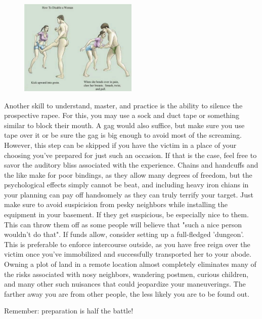 \begin{figure}
\includegraphics[width=0.5\textwidth]{images/cunt_punt.jpg}
\end{figure}

Another skill to understand, master, and practice is the ability to silence the prospective rapee.
For this, you may use a sock and duct tape or something similar to block their mouth. 
A gag would also suffice, but make sure you use tape over it or be sure the gag is big enough 
to avoid most of the screaming. However, this step can be skipped if you have the victim in a place of
your choosing you've prepared for just such an occasion. If that is the case, feel free to savor the
auditory bliss associated with the experience. Chains and handcuffs and the like make for poor bindings,
as they allow many degrees of freedom, but the psychological effects simply cannot be beat, and including 
heavy iron chians in your planning can pay off handsomely as they can truly terrify your target. Just make 
sure to avoid suspicision from pesky neighbors while installing the equipment in your basement. 
If they get suspicious, be especially nice to them. This can throw them off as some people will believe that 
"such a nice person wouldn't do that".  If funds allow, consider setting up a full-fledged 'dungeon'. This is 
preferable to enforce intercourse outside, as you have free reign over the victim once you've immobilized and
successfully transported her to your abode. Owning a plot of land in a remote location almost completely
eliminates many of the risks associated with nosy neighbors, wandering postmen, curious
children, and many other such nuisances that could jeopardize your maneuverings. The farther away you are from 
other people, the less likely you are to be found out.

Remember: preparation is half the battle!
